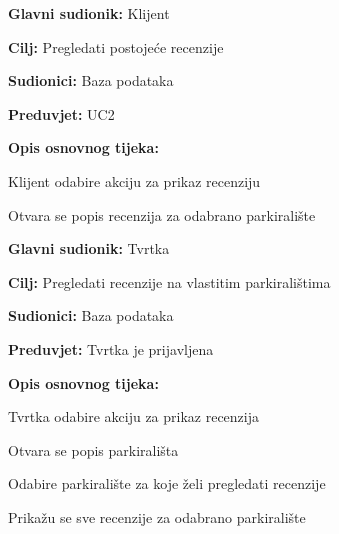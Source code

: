 \noindent {}
\begin{packed_item}
	
	\item \textbf{Glavni sudionik:} Klijent
	\item  \textbf{Cilj:} Pregledati postojeće recenzije
	\item  \textbf{Sudionici:} Baza podataka
	\item  \textbf{Preduvjet:} UC2
	\item  \textbf{Opis osnovnog tijeka:}
	
	\item[] \begin{packed_enum}
		
		\item Klijent odabire akciju za prikaz recenziju
		\item Otvara se popis recenzija za odabrano parkiralište
	
	\end{packed_enum}
\end{packed_item}

\noindent {}
\begin{packed_item}
	
	\item \textbf{Glavni sudionik:} Tvrtka
	\item  \textbf{Cilj:} Pregledati recenzije na vlastitim parkiralištima
	\item  \textbf{Sudionici:} Baza podataka
	\item  \textbf{Preduvjet:} Tvrtka je prijavljena
	\item  \textbf{Opis osnovnog tijeka:}
	
	\item[] \begin{packed_enum}
		
		\item Tvrtka odabire akciju za prikaz recenzija
		\item Otvara se popis parkirališta
		\item Odabire parkiralište za koje želi pregledati recenzije
		\item Prikažu se sve recenzije za odabrano parkiralište
	
	\end{packed_enum}
\end{packed_item}

